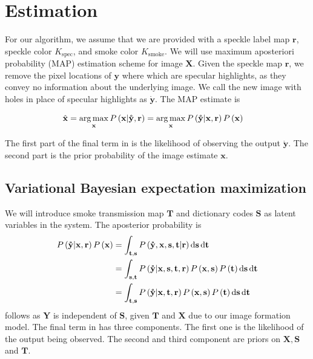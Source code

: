 \chapter{Estimation}

For our algorithm, we assume that we are provided with a speckle label map $\mathbf{r}$, speckle color $K_\text{spec}$, and smoke color $K_\text{smoke}$. We will use maximum aposteriori probability (MAP) estimation scheme for image $\mathbf{X}$. Given the speckle map $\mathbf{r}$, we remove the pixel locations of $\mathbf{y}$ where which are specular highlights, as they convey no information about the underlying image. We call the new image with holes in place of specular highlights as $\mathbf{\mathring y}$. The MAP estimate is

\begin{align}
\hat{\mathbf{x}} &= \operatorname*{arg\,max}_\mathbf{x} P \left( \mathbf{x} | \mathbf{\mathring y}, \mathbf{r} \right) = \operatorname*{arg\,max}_\mathbf{x} P \left( \mathbf{\mathring y} | \mathbf{x}, \mathbf{r} \right) P \left( \mathbf{x} \right) \label{eqn:simplemap}
\end{align}

The first part of the final term in  is the likelihood of observing the output $\mathbf{\mathring y}$. The second part is the prior probability of the image estimate $\mathbf{x}$.


\section{Variational Bayesian expectation maximization}
We will introduce smoke transmission map $\mathbf{T}$ and dictionary codes $\mathbf{S}$ as latent variables in the system. The aposterior probability is 
\begin{align}
P \left( \mathbf{\mathring y} | \mathbf{x}, \mathbf{r} \right) P \left( \mathbf{x} \right) &= \int_{\mathbf{t}, \mathbf{s} } P \left( \mathbf{\mathring y}, \mathbf{x}, \mathbf{s}, \mathbf{t} | \mathbf{r} \right) \mathop{}\!\mathrm{d} \mathbf{s} \mathop{}\!\mathrm{d}\mathbf{t} \\
&= \int_{\mathbf{s}, \mathbf{t}} P \left( \mathbf{\mathring y} | \mathbf{x}, \mathbf{s},  \mathbf{t}, \mathbf{r} \right)  P \left(\mathbf{x}, \mathbf{s} \right) P \left( \mathbf{t} \right) \mathop{}\!\mathrm{d}\mathbf{s} \mathop{}\!\mathrm{d}\mathbf{t} \label{eqn:mapDerive1}\\
&= \int_{\mathbf{t}, \mathbf{s}} P \left( \mathbf{\mathring y} | \mathbf{x}, \mathbf{t}, \mathbf{r} \right)  P \left(\mathbf{x}, \mathbf{s} \right) P \left( \mathbf{t} \right) \mathop{}\!\mathrm{d}\mathbf{s} \mathop{}\!\mathrm{d}\mathbf{t}  \label{eqn:mapDerive2}
\end{align}
 follows as $\mathbf{Y}$ is independent of $\mathbf{S}$, given $\mathbf{T}$ and $\mathbf{X}$ due to our image formation model.
The final term in  has three components. The first one is the likelihood of the output being observed. The second and third component are priors on $\mathbf{X}, \mathbf{S}$ and $\mathbf{T}$.

